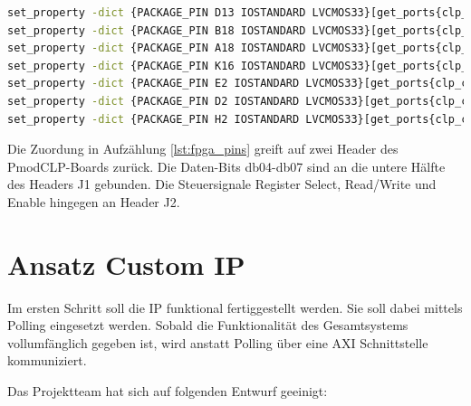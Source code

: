 \begin{lstlisting}[language=bash,caption={Pin-Zuordnung im Constraints-File},breaklines=true,captionpos=b,basicstyle=\footnotesize\ttfamily,
    label={lst:fpga_pins}]
set_property -dict {PACKAGE_PIN D13 IOSTANDARD LVCMOS33}[get_ports{clp_db_tri_io[4]}];#db04
set_property -dict {PACKAGE_PIN B18 IOSTANDARD LVCMOS33}[get_ports{clp_db_tri_io[5]}];#db05
set_property -dict {PACKAGE_PIN A18 IOSTANDARD LVCMOS33}[get_ports{clp_db_tri_io[6]}];#db06
set_property -dict {PACKAGE_PIN K16 IOSTANDARD LVCMOS33}[get_ports{clp_db_tri_io[7]}];#db07
set_property -dict {PACKAGE_PIN E2 IOSTANDARD LVCMOS33}[get_ports{clp_cb_tri_o[0]}];  #lcd_rs
set_property -dict {PACKAGE_PIN D2 IOSTANDARD LVCMOS33}[get_ports{clp_cb_tri_o[1]}];  #lcd_rw
set_property -dict {PACKAGE_PIN H2 IOSTANDARD LVCMOS33}[get_ports{clp_cb_tri_o[2]}];  #lcd_e
\end{lstlisting}

Die Zuordung in Aufzählung \ref{lst:fpga_pins} greift auf zwei Header des PmodCLP-Boards zurück. Die Daten-Bits db04-db07 sind an die untere Hälfte des Headers J1 gebunden. Die Steuersignale Register Select, Read/Write und Enable hingegen an Header J2.

\section{Ansatz Custom IP}

Im ersten Schritt soll die IP funktional fertiggestellt werden. Sie soll dabei mittels Polling eingesetzt werden. Sobald die Funktionalität des Gesamtsystems vollumfänglich gegeben ist, wird anstatt Polling über eine AXI Schnittstelle kommuniziert.\newline

Das Projektteam hat sich auf folgenden Entwurf geeinigt:

